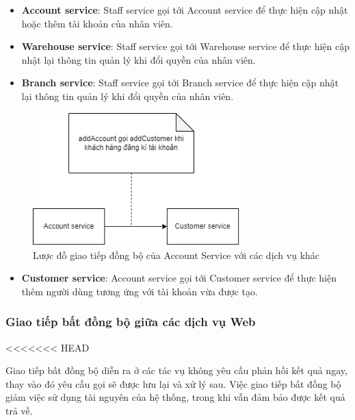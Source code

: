 \begin{itemize}
	\item \textbf{Account service}: Staff service gọi tới Account service để thực hiện cập nhật hoặc thêm tài khoản của nhân viên.
	\item \textbf{Warehouse service}: Staff service gọi tới Warehouse service để thực hiện cập nhật lại thông tin quản lý khi đổi quyền của nhân viên.
	\item \textbf{Branch service}: Staff service gọi tới Branch service để thực hiện cập nhật lại thông tin quản lý khi đổi quyền của nhân viên.
\end{itemize}

\begin{figure}[!htp]
	\centering
	\includegraphics[width=8cm]{img/Architecture/service/account-call.png}
	\newline
	\caption{Lược đồ giao tiếp đồng bộ của Account Service với các dịch vụ khác}
\end{figure}

\begin{itemize}
	\item \textbf{Customer service}: Account service gọi tới Customer service để thực hiện thêm người dùng tương ứng với tài khoản vừa được tạo.
\end{itemize}

\subsubsection{Giao tiếp bất đồng bộ giữa các dịch vụ Web}

<<<<<<< HEAD
\par Giao tiếp bất đồng bộ diễn ra ở các tác vụ không yêu cầu phản hồi kết quả ngay, thay vào đó yêu cầu gọi sẽ được lưu lại và xử lý sau. Việc giao tiếp bất đồng bộ giảm việc sử dụng tài nguyên của hệ thống, trong khi vẫn đảm bảo được kết quả trả về.

